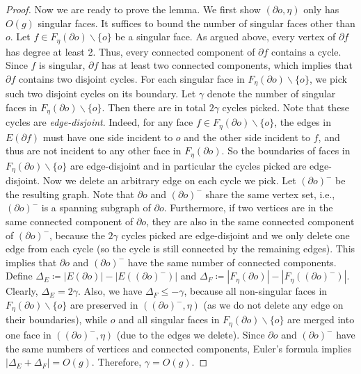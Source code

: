 \documentclass[a4paper,11pt]{article}
\numberwithin{lemma}{section}
\begin{document}
\begin{proof}
Now we are ready to prove the lemma.
We first show $(\partial o,\eta)$ only has $O(g)$ singular faces.
It suffices to bound the number of singular faces other than $o$.
Let $f \in F_\eta(\partial o) \backslash \{o\}$ be a singular face.
As argued above, every vertex of $\partial f$ has degree at least 2.
Thus, every connected component of $\partial f$ contains a cycle.
Since $f$ is singular, $\partial f$ has at least two connected components, which implies that $\partial f$ contains two disjoint cycles.
For each singular face in $F_\eta(\partial o) \backslash \{o\}$, we pick such two disjoint cycles on its boundary.
Let $\gamma$ denote the number of singular faces in $F_\eta(\partial o) \backslash \{o\}$.
Then there are in total $2 \gamma$ cycles picked.
Note that these cycles are \emph{edge-disjoint}.
Indeed, for any face $f \in F_\eta(\partial o) \backslash \{o\}$, the edges in $E(\partial f)$ must have one side incident to $o$ and the other side incident to $f$, and thus are not incident to any other face in $F_\eta(\partial o)$.
So the boundaries of faces in $F_\eta(\partial o) \backslash \{o\}$ are edge-disjoint and in particular the cycles picked are edge-disjoint.
Now we delete an arbitrary edge on each cycle we pick.
Let $(\partial o)^-$ be the resulting graph.
Note that $\partial o$ and $(\partial o)^-$ share the same vertex set, i.e., $(\partial o)^-$ is a spanning subgraph of $\partial o$.
Furthermore, if two vertices are in the same connected component of $\partial o$, they are also in the same connected component of $(\partial o)^-$, because the $2 \gamma$ cycles picked are edge-disjoint and we only delete one edge from each cycle (so the cycle is still connected by the remaining edges).
This implies that $\partial o$ and $(\partial o)^-$ have the same number of connected components.
Define $\Delta_E \coloneqq |E(\partial o)| - |E((\partial o)^-)|$ and $\Delta_F \coloneqq |F_\eta(\partial o)| - |F_\eta((\partial o)^-)|$.
Clearly, $\Delta_E = 2\gamma$.
Also, we have $\Delta_F \leq -\gamma$, because all non-singular faces in $F_\eta(\partial o) \backslash \{o\}$ are preserved in $((\partial o)^-,\eta)$ (as we do not delete any edge on their boundaries), while $o$ and all singular faces in $F_\eta(\partial o) \backslash \{o\}$ are merged into one face in $((\partial o)^-,\eta)$ (due to the edges we delete).
Since $\partial o$ and $(\partial o)^-$ have the same numbers of vertices and connected components, Euler's formula implies $|\Delta_E + \Delta_F| = O(g)$.
Therefore, $\gamma = O(g)$.


\end{proof}
\end{document}
